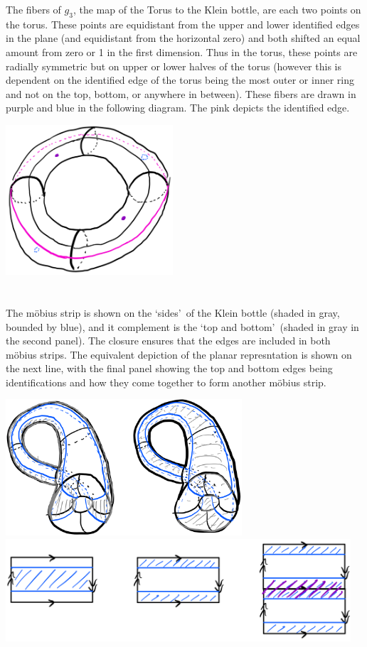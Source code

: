 \documentclass{jhwhw}
\begin{document}
\noindent
The fibers of $g_3$, the map of the Torus to the Klein bottle, are each two points on the torus. These points are equidistant from the upper and lower identified edges in the plane (and equidistant from the horizontal zero) and both shifted an equal amount from zero or 1 in the first dimension. Thus in the torus, these points are radially symmetric but on upper or lower halves of the torus (however this is dependent on the identified edge of the torus being the most outer or inner ring and not on the top, bottom, or anywhere in between). These fibers are drawn in purple and blue in the following diagram. The pink depicts the identified edge.
\begin{center}
	\includegraphics[height=2.2in]{5_4a2.png}
\end{center}

\part{}%
\noindent The m\"obius strip is shown on the \lq sides\rq\ of the Klein bottle (shaded in gray, bounded by blue), and it complement is the \lq top and bottom\rq\ (shaded in gray in the second panel). The closure ensures that the edges are included in both m\"obius strips. The equivalent depiction of the planar represntation is shown on the next line, with the final panel showing the top and bottom edges being identifications and how they come together to form another m\"obius strip.
\begin{center}
	\includegraphics[height=2in]{5_4b1.png}\\
	\vskip 1cm
	\includegraphics[height=1.5in]{5_4b2.png}
\end{center}
\end{document}
